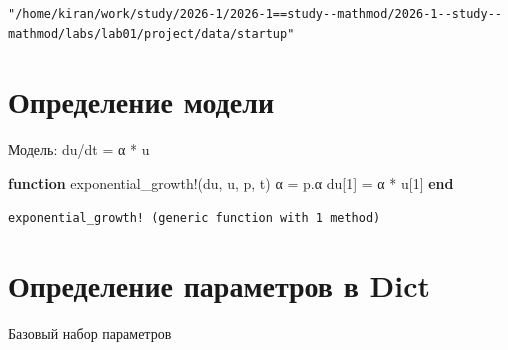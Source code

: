 \documentclass[
  russian,
  12pt,
  a4paper,
  DIV=11,
  numbers=noendperiod]{scrreprt}
\newenvironment{Shaded}{\begin{snugshade}}{\end{snugshade}}
\newcommand{\ControlFlowTok}[1]{\textcolor[rgb]{0.00,0.23,0.31}{\textbf{#1}}}
\newcommand{\FloatTok}[1]{\textcolor[rgb]{0.68,0.00,0.00}{#1}}
\newcommand{\FunctionTok}[1]{\textcolor[rgb]{0.28,0.35,0.67}{#1}}
\newcommand{\KeywordTok}[1]{\textcolor[rgb]{0.00,0.23,0.31}{\textbf{#1}}}
\newcommand{\NormalTok}[1]{\textcolor[rgb]{0.00,0.23,0.31}{#1}}
\newcommand{\OperatorTok}[1]{\textcolor[rgb]{0.37,0.37,0.37}{#1}}
\newcommand{\SpecialCharTok}[1]{\textcolor[rgb]{0.37,0.37,0.37}{#1}}
\newcommand{\StringTok}[1]{\textcolor[rgb]{0.13,0.47,0.30}{#1}}
\begin{document}
\begin{verbatim}
"/home/kiran/work/study/2026-1/2026-1==study--mathmod/2026-1--study--mathmod/labs/lab01/project/data/startup"
\end{verbatim}

\section{Определение
модели}\label{ux43eux43fux440ux435ux434ux435ux43bux435ux43dux438ux435-ux43cux43eux434ux435ux43bux438-1}

Модель: du/dt = α * u

\begin{Shaded}
\begin{Highlighting}[]
\KeywordTok{function} \FunctionTok{exponential\_growth!}\NormalTok{(du, u, p, t)}
\NormalTok{    α }\OperatorTok{=}\NormalTok{ p.α}
\NormalTok{    du[}\FloatTok{1}\NormalTok{] }\OperatorTok{=}\NormalTok{ α }\OperatorTok{*}\NormalTok{ u[}\FloatTok{1}\NormalTok{]}
\KeywordTok{end}
\end{Highlighting}
\end{Shaded}

\begin{verbatim}
exponential_growth! (generic function with 1 method)
\end{verbatim}

\section{Определение параметров в
Dict}\label{ux43eux43fux440ux435ux434ux435ux43bux435ux43dux438ux435-ux43fux430ux440ux430ux43cux435ux442ux440ux43eux432-ux432-dict}

Базовый набор параметров

\begin{Shaded}
\end{Shaded}
\end{document}

